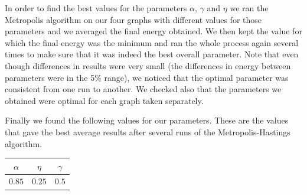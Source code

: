 \documentclass[a4paper]{article}
\begin{document}
In order to find the best values for the parameters $\alpha$, $\gamma$ and $\eta$ we ran the Metropolis algorithm on our four graphs with different values for those parameters and we averaged the final energy obtained. We then kept the value for which the final energy was the minimum and ran the whole process again several times to make sure that it was indeed the best overall parameter. Note that even though differences in results were very small (the differences in energy between parameters were in the 5\% range), we noticed that the optimal parameter was consistent from one run to another. We checked also that the parameters we obtained were optimal for each graph taken separately.

Finally we found the following values for our parameters. These are the values that gave the best average results after several runs of the Metropolis-Hastings algorithm.

\begin{center}
\begin{tabular}{|c|c|c|}
\hline 
$\alpha$ & $\eta$ & $\gamma$ \\ 
\hline 
$0.85$ & $0.25$ & $0.5$ \\ 
\hline 
\end{tabular} 
\end{center}
\end{document}

